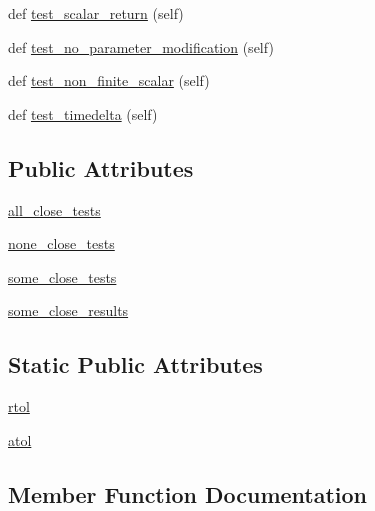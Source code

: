 \begin{DoxyCompactItemize}
\item 
def \hyperlink{classnumpy_1_1core_1_1tests_1_1test__numeric_1_1TestIsclose_a663127045ade067846fad59849df8521}{test\+\_\+scalar\+\_\+return} (self)
\item 
def \hyperlink{classnumpy_1_1core_1_1tests_1_1test__numeric_1_1TestIsclose_a060bef727b538860ae9cf7e637b88b5c}{test\+\_\+no\+\_\+parameter\+\_\+modification} (self)
\item 
def \hyperlink{classnumpy_1_1core_1_1tests_1_1test__numeric_1_1TestIsclose_a495b7294e4a0875cdc950d230b1aed03}{test\+\_\+non\+\_\+finite\+\_\+scalar} (self)
\item 
def \hyperlink{classnumpy_1_1core_1_1tests_1_1test__numeric_1_1TestIsclose_a56107f2c474f93e4ac8f734ff3478bd8}{test\+\_\+timedelta} (self)
\end{DoxyCompactItemize}
\subsection*{Public Attributes}
\begin{DoxyCompactItemize}
\item 
\hyperlink{classnumpy_1_1core_1_1tests_1_1test__numeric_1_1TestIsclose_a8bc7b21d8e28f64390b2328e0283addf}{all\+\_\+close\+\_\+tests}
\item 
\hyperlink{classnumpy_1_1core_1_1tests_1_1test__numeric_1_1TestIsclose_ad7c85236403054f9c2a688ef9296c427}{none\+\_\+close\+\_\+tests}
\item 
\hyperlink{classnumpy_1_1core_1_1tests_1_1test__numeric_1_1TestIsclose_a4711c87e4f673a7ac6ba0e340e027926}{some\+\_\+close\+\_\+tests}
\item 
\hyperlink{classnumpy_1_1core_1_1tests_1_1test__numeric_1_1TestIsclose_ab4e541fd78052d041d52983157021e25}{some\+\_\+close\+\_\+results}
\end{DoxyCompactItemize}
\subsection*{Static Public Attributes}
\begin{DoxyCompactItemize}
\item 
\hyperlink{classnumpy_1_1core_1_1tests_1_1test__numeric_1_1TestIsclose_a60f7404e4621daa1779085140bca7d39}{rtol}
\item 
\hyperlink{classnumpy_1_1core_1_1tests_1_1test__numeric_1_1TestIsclose_a96922491d693a777803a37c71e9d2181}{atol}
\end{DoxyCompactItemize}


\subsection{Member Function Documentation}
\mbox{\label{classnumpy_1_1core_1_1tests_1_1test__numeric_1_1TestIsclose_aee978af4aabaf8477dac11e9093b1eee}} 
